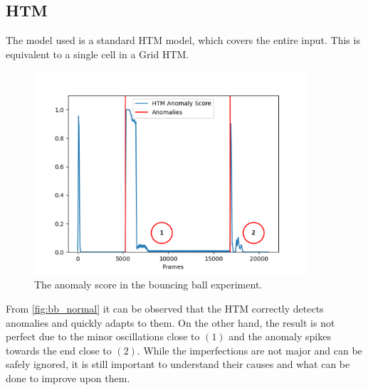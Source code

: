 \subsection{HTM}
The model used is a standard HTM model, which covers the entire input. This is equivalent to a single cell in a Grid HTM.
\begin{figure}[H]
    \centering
    \includegraphics[width=0.9\textwidth]{resources/experiments/bouncing_ball/bb_anoms_bad.png}
    \caption{The anomaly score in the bouncing ball experiment.}
    \label{fig:bb_normal}
\end{figure}
From \autoref{fig:bb_normal} it can be observed that the HTM correctly detects anomalies and quickly adapts to them. On the other hand, the result is not perfect due to the minor oscillations close to $(1)$ and the anomaly spikes towards the end close to $(2)$. While the imperfections are not major and can be safely ignored, it is still important to understand their causes and what can be done to improve upon them. \par
